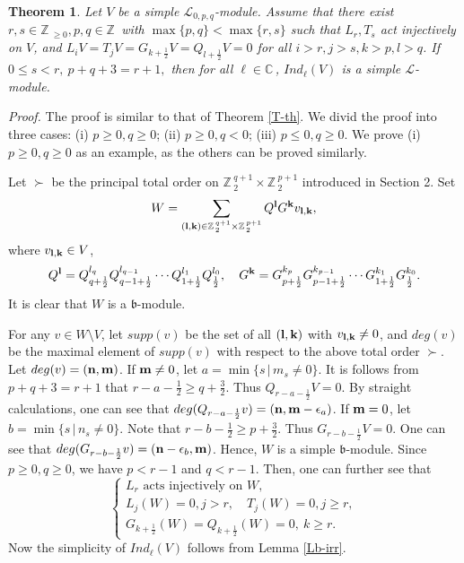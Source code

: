 \documentclass[12pt]{article}
\def\ssc{\scriptscriptstyle}
\def\Z{\mathbb{Z}{\ssc\,}}
\def\C{\mathbb{C}{\ssc\,}}
\numberwithin{equation}{section}
\newtheorem{theo}{Theorem}[section]
\begin{document}
\begin{theo}\label{L-th} Let $V$ be a simple $\mathcal{L}_{0,p,q}$-module.  Assume that there exist $r,s\in\Z_{\ge 0}, p,q\in\Z$ with  $\max\{p,q\}<\max\{r,s\}$ such that $L_r,T_s$ act injectively on $V$, and  $L_iV=T_jV=G_{k+\frac{1}{2}}V=Q_{l+\frac{1}{2}}V=0$ for all $i>r,j>s,k>p,l>q$.
If $0\le s<r,\ p+q+3=r+1,$ then for all $\ell\in\C$, $Ind_\ell(V)$ is a simple $\mathcal{L}$-module.
\end{theo}
{\it Proof.} The proof is similar to that of Theorem \ref{T-th}. We divid the proof into three cases: (i) $p\ge 0,q\ge 0$; (ii) $p\ge 0,q< 0$; (iii) $p\le 0,q\ge 0$. We prove  (i)  $p\ge 0,q\ge 0$ as an example, as the others can be proved similarly.

Let $\succ$ be the principal total order on $\Z_2^{q+1}\times \Z_2^{p+1}$  introduced in Section 2. Set
 $$W=\sum\limits_{({\bf l,k})\in \Z_2^{q+1}\times \Z_2^{p+1}}Q^{\bf l}G^{\bf k}v_{\bf l,k},$$
 where $v_{{\bf l,k}}\in V$, $$Q^{{\bf l}}=Q_{q+\frac{1}{2}}^{l_{q}}Q_{q-1+\frac{1}{2}}^{l_{q-1}}\cdots Q_{1+\frac{1}{2}}^{l_{1}} Q_{\frac{1}{2}}^{l_{0}}, \quad
 G^{{\bf k}}=G_{p+\frac{1}{2}}^{k_{p}}G_{p-1+\frac{1}{2}}^{k_{p-1}}\cdots G_{1+\frac{1}{2}}^{k_{1}} G_{\frac{1}{2}}^{k_{0}}.$$
It is clear that $W$ is a $\mathfrak{b}$-module.

 For any $v\in W\setminus V$, let $supp(v)$ be the set of all $(\bf l,k)$ with $v_{\bf l,k}\ne 0$, and $deg(v)$ be the maximal element of $supp(v)$ with respect to the above  total order $\succ$.  Let $deg(v)=(\bf n,m)$.
If ${\bf m}\ne 0$, let $a=\min\{s\,|\,m_s\ne 0\}$. It is follows from $p+q+3=r+1$ that  $r-a-\frac{1}{2}\ge q+\frac{3}{2}$. Thus $Q_{r-a-\frac{1}{2}}V=0$. By straight calculations, one can see that $deg(Q_{r-a-\frac{1}{2}}v)=({\bf n,m}-\epsilon_a)$. If ${\bf m}=0$, let $b=\min\{s\,|\,n_s\ne 0\}$. Note that $r-b-\frac{1}{2}\ge p+\frac{3}{2}$. Thus $G_{r-b-\frac{1}{2}}V=0$. One can see that $deg(G_{r-b-\frac{1}{2}}v)=({\bf n}-\epsilon_b,{\bf m})$. Hence,  $W$ is a simple $\mathfrak{b}$-module. Since  $p\ge 0,q\ge 0$, we have $p<r-1$ and $q<r-1$.
Then, one can further see that
\begin{equation}\label{W-irr}\left\{\begin{array}{l}
 L_r \mbox{ acts injectively on } W,\\
L_j(W)=0,j>r, \quad  T_j(W)=0,j\ge r,\\
 G_{k+\frac{1}{2}}(W)= Q_{k+\frac{1}{2}}(W)=0,\ k\ge r.\end{array}
\right.
\end{equation}
Now the simplicity of $Ind_\ell(V)$  follows from Lemma \ref{Lb-irr}.
\end{document}
